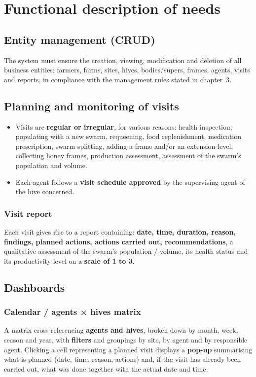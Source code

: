 \chapter{Functional description of needs}

\section{Entity management (CRUD)}
The system must ensure the creation, viewing, modification and deletion of all
business entities: farmers, farms, sites, hives, bodies/supers, frames, agents,
visits and reports, in compliance with the management rules stated in
chapter~3.

\section{Planning and monitoring of visits}
\begin{itemize}
  \item Visits are \textbf{regular or irregular}, for various reasons:
        health inspection, populating with a new swarm, requeening,
        food replenishment, medication prescription, swarm splitting,
        adding a frame and/or an extension level, collecting honey frames,
        production assessment, assessment of the swarm's population and volume.
  \item Each agent follows a \textbf{visit schedule approved} by the supervising agent of the hive concerned.
\end{itemize}

\subsection{Visit report}
Each visit gives rise to a report containing: \textbf{date, time, duration,
reason, findings, planned actions, actions carried out, recommendations}, a
qualitative assessment of the swarm's population / volume, its health status and
its productivity level on a \textbf{scale of 1 to 3}.

\section{Dashboards}

\subsection{Calendar / agents × hives matrix}
A matrix cross-referencing \textbf{agents and hives}, broken down by month, week,
season and year, with \textbf{filters} and groupings by site, by agent and by
responsible agent. Clicking a cell representing a planned visit displays a
\textbf{pop-up} summarising what is planned (date, time, reason, actions) and, if
the visit has already been carried out, what was done together with the actual
date and time.

